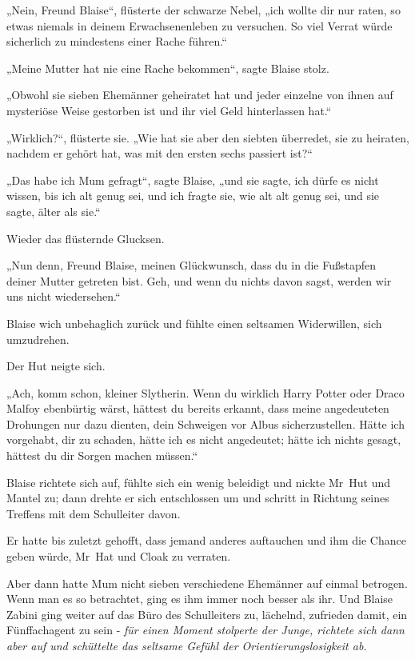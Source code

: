 {„Nein, Freund Blaise“, flüsterte der schwarze Nebel, „ich wollte dir nur raten, so etwas niemals in deinem Erwachsenenleben zu versuchen. So viel Verrat würde sicherlich zu mindestens einer Rache führen.“

„Meine Mutter hat nie eine Rache bekommen“, sagte Blaise stolz.

„Obwohl sie sieben Ehemänner geheiratet hat und jeder einzelne von ihnen auf mysteriöse Weise gestorben ist und ihr viel Geld hinterlassen hat.“

„Wirklich?“, flüsterte sie. „Wie hat sie aber den siebten überredet, sie zu heiraten, nachdem er gehört hat, was mit den ersten sechs passiert ist?“

„Das habe ich Mum gefragt“, sagte Blaise, „und sie sagte, ich dürfe es nicht wissen, bis ich alt genug sei, und ich fragte sie, wie alt alt genug sei, und sie sagte, älter als sie.“

Wieder das flüsternde Glucksen.

„Nun denn, Freund Blaise, meinen Glückwunsch, dass du in die Fußstapfen deiner Mutter getreten bist. Geh, und wenn du nichts davon sagst, werden wir uns nicht wiedersehen.“

Blaise wich unbehaglich zurück und fühlte einen seltsamen Widerwillen, sich umzudrehen.

Der Hut neigte sich.

„Ach, komm schon, kleiner Slytherin. Wenn du wirklich Harry Potter oder Draco Malfoy ebenbürtig wärst, hättest du bereits erkannt, dass meine angedeuteten Drohungen nur dazu dienten, dein Schweigen vor Albus sicherzustellen. Hätte ich vorgehabt, dir zu schaden, hätte ich es nicht angedeutet; hätte ich nichts gesagt, hättest du dir Sorgen machen müssen.“

Blaise richtete sich auf, fühlte sich ein wenig beleidigt und nickte Mr~Hut und Mantel zu; dann drehte er sich entschlossen um und schritt in Richtung seines Treffens mit dem Schulleiter davon.

Er hatte bis zuletzt gehofft, dass jemand anderes auftauchen und ihm die Chance geben würde, Mr~Hat und Cloak zu verraten.

Aber dann hatte Mum nicht sieben verschiedene Ehemänner auf einmal betrogen. Wenn man es so betrachtet, ging es ihm immer noch besser als ihr. Und Blaise Zabini ging weiter auf das Büro des Schulleiters zu, lächelnd, zufrieden damit, ein Fünffachagent zu sein - \emph{für einen Moment stolperte der Junge, richtete sich dann aber auf und schüttelte das seltsame Gefühl der Orientierungslosigkeit ab.}

}
